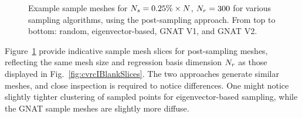 \begin{figure}
\begin{minipage}{0.99\linewidth}
	\end{minipage}
	\caption{\label{fig:cvrcIBlankSlicesDOF}Example sample meshes for $N_s = 0.25\% \times N$, $N_r = 300$ for various sampling algorithms, using the post-sampling approach. From top to bottom: random, eigenvector-based, GNAT V1, and GNAT V2.}
\end{figure}

Figure~\ref{fig:cvrcIBlankSlicesDOF} provide indicative sample mesh slices for post-sampling meshes, reflecting the same mesh size and regression basis dimension $N_r$ as those displayed in Fig.~\ref{fig:cvrcIBlankSlices}. The two approaches generate similar meshes, and close inspection is required to notice differences. One might notice slightly tighter clustering of sampled points for eigenvector-based sampling, while the GNAT sample meshes are slightly more diffuse.

